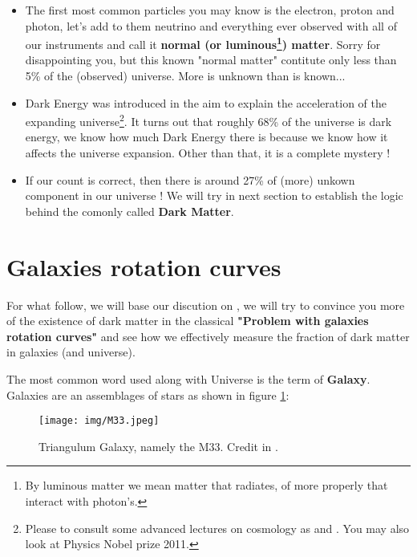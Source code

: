 \documentclass[12pt, letterpaper, twocolumn]{article}
\begin{document}
\begin{itemize}
\item The first most common particles you may know is the electron, proton and photon, let's add to them  neutrino and everything ever observed with all of our instruments and call it \textbf{normal (or luminous\footnote{By luminous matter we mean matter that radiates, of more properly that interact with photon's.}) matter}. Sorry for disappointing you, but this known "normal matter" contitute only less than 5\% of the (observed) universe. More is unknown than is known... \cite{nasa}
\item Dark Energy was introduced in the aim to explain the acceleration of the expanding universe\footnote{Please to consult some advanced lectures on cosmology as \cite{baumann2018} and \cite{Piattella_2018}. You may also look at Physics Nobel prize 2011.}. It turns out that roughly 68\% of the universe is dark energy, we know how much Dark Energy there is because we know how it affects the universe expansion. Other than that, it is a complete mystery !
\item If our count is correct, then there is around 27\% of (more) unkown component in our universe ! We will try in next section to establish the logic behind the comonly called \textbf{Dark Matter}.
\end{itemize}


\vspace{0.125in}

\section{Galaxies rotation curves}

For what follow, we will base our discution on \cite{Salucci_2019,susskind}, we will try to convince you more of the existence of dark matter in the classical \textbf{"Problem with galaxies rotation curves"} and see how we effectively measure the fraction of dark matter in galaxies (and universe).

The most common word used along with Universe is the term of \textbf{Galaxy}. Galaxies are an assemblages of stars as shown in figure \ref{galaxy}: 

\begin{figure}[ht]
    \centering
    \texttt{[image: img/M33.jpeg]}
    \caption{Triangulum Galaxy, namely the M33. Credit in \cite{m33}.}
    \label{galaxy}
\end{figure}
\end{document}
